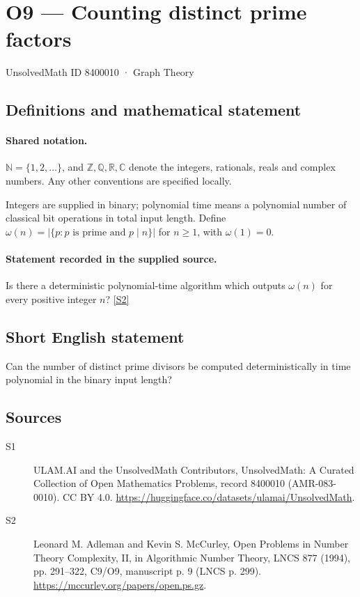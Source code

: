\documentclass[11pt]{article}
\newcommand{\sref}[2]{\hyperlink{source:#1:#2}{[S#2]}}
\begin{document}
\setcounter{section}{8400009}
\section{O9 — Counting distinct prime factors}\label{8400010}
{\small\sffamily UnsolvedMath ID 8400010 · Graph Theory}
\subsection{Definitions and mathematical statement}

\paragraph{Shared notation.}$\mathbb N=\{1,2,\ldots\}$, and $\mathbb Z,\mathbb Q,\mathbb R,\mathbb C$ denote the integers, rationals, reals and complex numbers. Any other conventions are specified locally.


Integers are supplied in binary; polynomial time means a polynomial number of classical bit operations in total input length. Define $\omega(n)=|\{p:p\text{ is prime and }p\mid n\}|$ for $n\ge1$, with $\omega(1)=0$.
\paragraph{Statement recorded in the supplied source.}
Is there a deterministic polynomial-time algorithm which outputs $\omega(n)$ for every positive integer $n$? \sref{8400010}{2}
\subsection{Short English statement}
Can the number of distinct prime divisors be computed deterministically in time polynomial in the binary input length?
\subsection{Sources}
\begin{description}
\item[\hypertarget{source:8400010:1}{S1}] ULAM.AI and the UnsolvedMath Contributors, UnsolvedMath: A Curated Collection of Open Mathematics Problems, record 8400010 (AMR-083-0010). CC BY 4.0. \url{https://huggingface.co/datasets/ulamai/UnsolvedMath}.
\item[\hypertarget{source:8400010:2}{S2}] Leonard M. Adleman and Kevin S. McCurley, Open Problems in Number Theory Complexity, II, in Algorithmic Number Theory, LNCS 877 (1994), pp. 291--322, C9/O9, manuscript p. 9 (LNCS p. 299). \url{https://mccurley.org/papers/open.ps.gz}.
\end{description}
\label{end:8400010}
\end{document}
